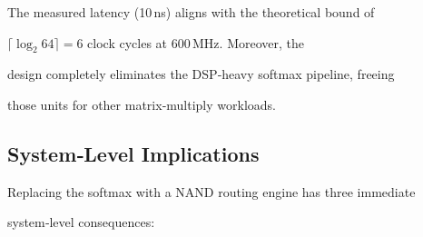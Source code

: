 The measured latency (10\,ns) aligns with the theoretical bound of






\(\lceil\log_2 64\rceil = 6\) clock cycles at 600\,MHz.  Moreover, the






design completely eliminates the DSP‑heavy softmax pipeline, freeing






those units for other matrix‑multiply workloads.













\subsection{System‑Level Implications}






\label{subsec:system}













Replacing the softmax with a NAND routing engine has three immediate






system‑level consequences:













